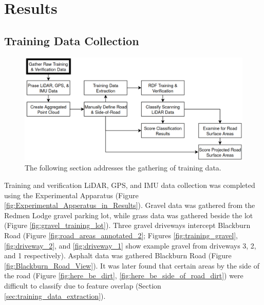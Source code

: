 \documentclass[numbered,pdftex]{ohio-etd}
\begin{document}
\chapter{Results}{
	
	\section{Training Data Collection}\label{sec:training-data-collection}{
		
		\begin{figure}[H]
			\centering
			\includegraphics[width=0.9\linewidth]{Defense_Images/flowz_gather_data}
			\caption[Training Data Collection Flowchart Context]{The following section addresses the gathering of training data.}
			\label{fig:flowz_gather_data}
		\end{figure}
	
		{Training and verification LiDAR, GPS, and IMU data collection was completed using the Experimental Apparatus (Figure \ref{fig:Experimental_Apperatus_in_Results}). Gravel data was gathered from the Redmen Lodge gravel parking lot, while grass data was gathered beside the lot (Figure \ref{fig:gravel_training_lot}). Three gravel driveways intercept Blackburn Road (Figure \ref{fig:road_areas_annotated_2}; Figures \ref{fig:training_gravel}, \ref{fig:driveway_2}, and \ref{fig:driveway_1} show example gravel from driveways 3, 2, and 1 respectively). Asphalt data was gathered Blackburn Road (Figure \ref{fig:Blackburn_Road_View}). It was later found that certain areas by the side of the road (Figure \ref{fig:here_be_dirt}, \ref{fig:here_be_side_of_road_dirt}) were difficult to classify due to feature overlap (Section \ref{sec:training_data_extraction}). }
			
}}
\end{document}
